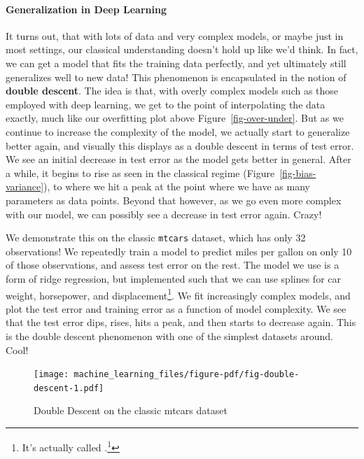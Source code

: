 \documentclass[
  letterpaper,
]{krantz}
\let\oldparagraph\paragraph
\renewcommand{\paragraph}[1]{\oldparagraph{#1}\mbox{}}
\DeclareRobustCommand{\href}[2]{#2\footnote{\url{#1}}}
\begin{document}
\paragraph{Generalization in Deep
Learning}\label{generalization-in-deep-learning}

It turns out, that with lots of data and very complex models, or maybe
just in most settings, our classical understanding doesn't hold up like
we'd think. In fact, we can get a model that fits the training data
perfectly, and yet ultimately still generalizes well to new data! This
phenomenon is encapsulated in the notion of \textbf{double descent}. The
idea is that, with overly complex models such as those employed with
deep learning, we get to the point of interpolating the data exactly,
much like our overfitting plot above Figure~\ref{fig-over-under}. But as
we continue to increase the complexity of the model, we actually start
to generalize better again, and visually this displays as a double
descent in terms of test error. We see an initial decrease in test error
as the model gets better in general. After a while, it begins to rise as
seen in the classical regime (Figure~\ref{fig-bias-variance}), to where
we hit a peak at the point where we have as many parameters as data
points. Beyond that however, as we go even more complex with our model,
we can possibly see a decrease in test error again. Crazy!

We demonstrate this on the classic \texttt{mtcars} dataset, which has
only 32 observations! We repeatedly train a model to predict miles per
gallon on only 10 of those observations, and assess test error on the
rest. The model we use is a form of ridge regression, but implemented
such that we can use splines for car weight, horsepower, and
displacement\footnote{It's actually called
  \href{https://www.stat.berkeley.edu/%7Eryantibs/statlearn-s23/lectures/ridgeless.pdf}{\emph{ridgeless}
  regression}.}. We fit increasingly complex models, and plot the test
error and training error as a function of model complexity. We see that
the test error dips, rises, hits a peak, and then starts to decrease
again. This is the double descent phenomenon with one of the simplest
datasets around. Cool!

\begin{figure}

{\centering \texttt{[image: machine\_learning\_files/figure-pdf/fig-double-descent-1.pdf]}

}

\caption{\label{fig-double-descent}Double Descent on the classic mtcars
dataset}

\end{figure}
\end{document}
